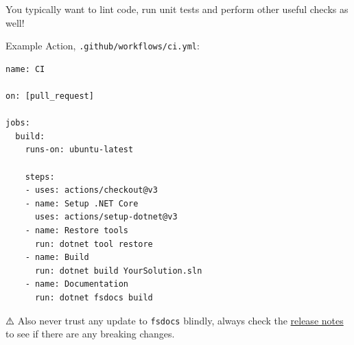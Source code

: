 \documentclass{article}
\begin{document}
You typically want to lint code, run unit tests and perform other useful checks as well!


Example Action, \texttt{.github/workflows/ci.yml}:
\begin{lstlisting}
name: CI

on: [pull_request]

jobs:
  build:
    runs-on: ubuntu-latest

    steps:
    - uses: actions/checkout@v3
    - name: Setup .NET Core
      uses: actions/setup-dotnet@v3
    - name: Restore tools
      run: dotnet tool restore
    - name: Build
      run: dotnet build YourSolution.sln
    - name: Documentation
      run: dotnet fsdocs build

\end{lstlisting}


⚠️ Also never trust any update to \texttt{fsdocs} blindly, always check the \href{https://github.com/fsprojects/FSharp.Formatting/blob/main/RELEASE\_NOTES.md}{release notes} to see if there are any breaking changes.
\end{document}
